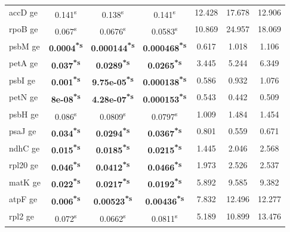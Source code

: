 \documentclass[a4paper]{article}
\begin{document}
\begin{longtable}{l|c|c|c|c|c|c}
accD ge&0.141\textsuperscript{s}&0.138\textsuperscript{s}&0.141\textsuperscript{s}&12.428&17.678&12.906\\
rpoB ge&0.067\textsuperscript{s}&0.0676\textsuperscript{s}&0.0583\textsuperscript{s}&10.869&24.957&18.069\\
psbM ge&\textbf{0.0004\textsuperscript{*}\textsuperscript{s}}&\textbf{0.000144\textsuperscript{*}\textsuperscript{s}}&\textbf{0.000468\textsuperscript{*}\textsuperscript{s}}&0.617&1.018&1.106\\
petA ge&\textbf{0.037\textsuperscript{*}\textsuperscript{s}}&\textbf{0.0289\textsuperscript{*}\textsuperscript{s}}&\textbf{0.0265\textsuperscript{*}\textsuperscript{s}}&3.445&5.244&6.349\\
psbI ge&\textbf{0.001\textsuperscript{*}\textsuperscript{s}}&\textbf{9.75e-05\textsuperscript{*}\textsuperscript{s}}&\textbf{0.000138\textsuperscript{*}\textsuperscript{s}}&0.586&0.932&1.076\\
petN ge&\textbf{8e-08\textsuperscript{*}\textsuperscript{s}}&\textbf{4.28e-07\textsuperscript{*}\textsuperscript{s}}&\textbf{0.000153\textsuperscript{*}\textsuperscript{s}}&0.543&0.442&0.509\\
psbH ge&0.086\textsuperscript{s}&0.0809\textsuperscript{s}&0.0797\textsuperscript{s}&1.009&1.484&1.454\\
psaJ ge&\textbf{0.034\textsuperscript{*}\textsuperscript{s}}&\textbf{0.0294\textsuperscript{*}\textsuperscript{s}}&\textbf{0.0367\textsuperscript{*}\textsuperscript{s}}&0.801&0.559&0.671\\
ndhC ge&\textbf{0.015\textsuperscript{*}\textsuperscript{s}}&\textbf{0.0185\textsuperscript{*}\textsuperscript{s}}&\textbf{0.0215\textsuperscript{*}\textsuperscript{s}}&1.445&2.046&2.568\\
rpl20 ge&\textbf{0.046\textsuperscript{*}\textsuperscript{s}}&\textbf{0.0412\textsuperscript{*}\textsuperscript{s}}&\textbf{0.0466\textsuperscript{*}\textsuperscript{s}}&1.973&2.526&2.537\\
matK ge&\textbf{0.022\textsuperscript{*}\textsuperscript{s}}&\textbf{0.0217\textsuperscript{*}\textsuperscript{s}}&\textbf{0.0192\textsuperscript{*}\textsuperscript{s}}&5.892&9.585&9.382\\
atpF ge&\textbf{0.006\textsuperscript{*}\textsuperscript{s}}&\textbf{0.00523\textsuperscript{*}\textsuperscript{s}}&\textbf{0.00436\textsuperscript{*}\textsuperscript{s}}&7.832&12.496&12.277\\
rpl2 ge&0.072\textsuperscript{s}&0.0662\textsuperscript{s}&0.0811\textsuperscript{s}&5.189&10.899&13.476\\

\end{longtable}
\end{document}
